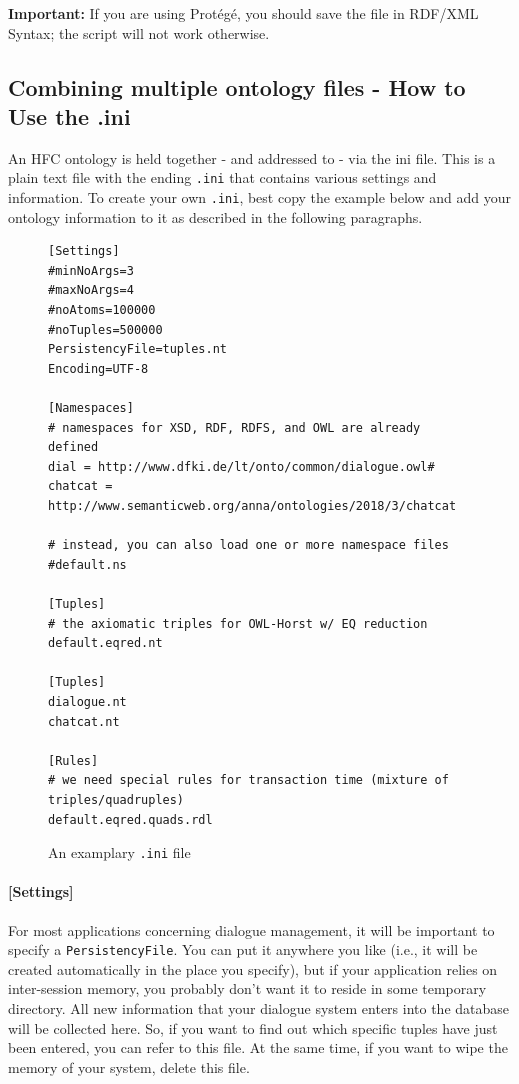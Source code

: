 \documentclass[a4paper]{report}
\begin{document}
\textbf{Important:} If you are using Prot\'eg\'e, you should save the file in RDF/XML Syntax; the script will not work otherwise.


\subsection{Combining multiple ontology files - How to Use the .ini}

An HFC ontology is held together - and addressed to - via the ini file. This is a plain text file with the ending \texttt{.ini} that contains various settings and information. To create your own \texttt{.ini}, best copy the example below and add your ontology information to it as described in the following paragraphs.

\begin{figure} [htbp]
\begin{verbatim}
[Settings]
#minNoArgs=3
#maxNoArgs=4
#noAtoms=100000
#noTuples=500000
PersistencyFile=tuples.nt
Encoding=UTF-8

[Namespaces]
# namespaces for XSD, RDF, RDFS, and OWL are already defined
dial = http://www.dfki.de/lt/onto/common/dialogue.owl#
chatcat = http://www.semanticweb.org/anna/ontologies/2018/3/chatcat

# instead, you can also load one or more namespace files
#default.ns

[Tuples]
# the axiomatic triples for OWL-Horst w/ EQ reduction
default.eqred.nt

[Tuples]
dialogue.nt
chatcat.nt

[Rules]
# we need special rules for transaction time (mixture of triples/quadruples)
default.eqred.quads.rdl
\end{verbatim}
\caption{An examplary \texttt{.ini} file}
\label{fig:ini}
\end{figure}

\paragraph{[Settings]}

For most applications concerning dialogue management, it will be important to specify a \texttt{PersistencyFile}. You can put it anywhere you like (i.e., it will be created automatically in the place you specify), but if your application relies on inter-session memory, you probably don't want it to reside in some temporary directory. All new information that your dialogue system enters into the database will be collected here. So, if you want to find out which specific tuples have just been entered, you can refer to this file. At the same time, if you want to wipe the memory of your system, delete this file.
\end{document}
